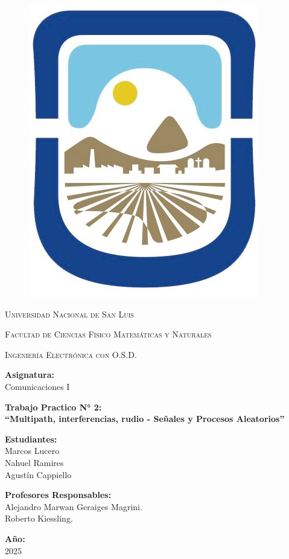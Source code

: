 \documentclass[11pt,a4paper]{article}
\begin{document}
    \begin{titlepage}	  
    		\centering
    		
    		\begin{figure}
    			\centering
    			\includegraphics[width=0.15\linewidth]{caratula/logo-unsl.jpg}
    		\end{figure}     
    		
    		{\scshape\LARGE Universidad Nacional de San Luis\\}
    		{\scshape Facultad de Ciencias Físico Matemáticas y Naturales\par}
    		{\scshape Ingeniería Electrónica con O.S.D.\par}
    		\vspace{2cm} 
    		
    		\Large \textbf {Asignatura:\\} 
    		\bigskip
    		\LARGE {\Huge Comunicaciones I}
    		\vspace{0.3cm}
    		
    		\LARGE \textbf {Trabajo Practico N° 2:\\} 
    		\vspace{0.7cm}
    		\LARGE \textbf {“Multipath, interferencias, rudio - Señales y Procesos Aleatorios”}

    		\vspace{2cm}
    		\LARGE \textbf {Estudiantes:\\} 
    		\LARGE Marcos Lucero \\ Nahuel Ramires\\ Agustín Cappiello\\
    		\bigskip
    		
    		
    		\vspace{1cm}
    		
    		\Large \textbf {Profesores Responsables:\\} 
    		\bigskip
    		\Large Alejandro Marwan Geraiges Magrini. \\ Roberto Kiessling.
    		
    		
    		\vspace{3cm}
    		
    		\Large \textbf {Año:\\} 
    		\Large 2025	
    	\end{titlepage}
    
\end{document}
